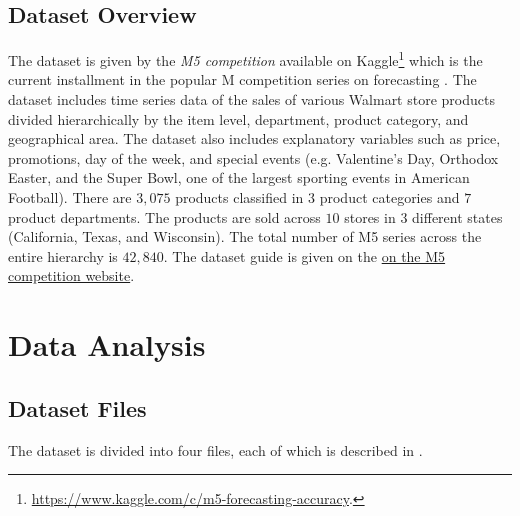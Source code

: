 \documentclass[12pt]{article}
\begin{document}
\subsection{Dataset Overview}
The dataset is given by the \emph{M5 competition} available on Kaggle\footnote{\url{https://www.kaggle.com/c/m5-forecasting-accuracy}.} which is the current installment in the popular M competition series on forecasting \citep{Makridakis2020}. The dataset includes time series data of the sales of various Walmart store products divided hierarchically by the item level, department, product category, and geographical area. The dataset also includes explanatory variables such as price, promotions, day of the week, and special events (e.g. Valentine's Day, Orthodox Easter, and the Super Bowl, one of the largest sporting events in American Football). There are $3,075$ products classified in $3$ product categories and $7$ product departments. The products are sold across $10$ stores in $3$ different states (California, Texas, and Wisconsin). The total number of M5 series across the entire hierarchy is $42,840$.  The dataset guide is given on the \href{https://mk0mcompetitiont8ake.kinstacdn.com/wp-content/uploads/2020/02/M5-Competitors-Guide_Final-1.pdf}{on the M5 competition website}.

\clearpage
\section{Data Analysis}
\subsection{Dataset Files}
The dataset is divided into four files, each of which is described in .
\end{document}
